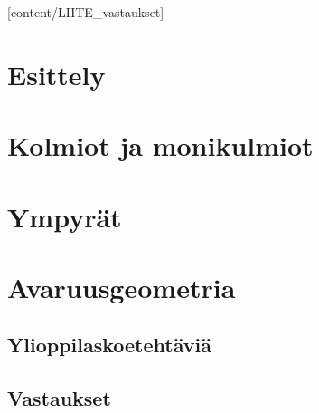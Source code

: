 [content/LIITE_vastaukset]

\chapter{Esittely}
    \newpage  %

\chapter{Kolmiot ja monikulmiot} %
    
    \newpage 
    \newpage 
    \newpage 
    \newpage 
    \newpage 
    \newpage 
    \newpage 

\chapter{Ympyrät}
    \newpage 
    \newpage 
    \newpage 

\chapter{Avaruusgeometria}
    \newpage 


\liitetyyli

\section{Ylioppilaskoetehtäviä}


\section{Vastaukset}

